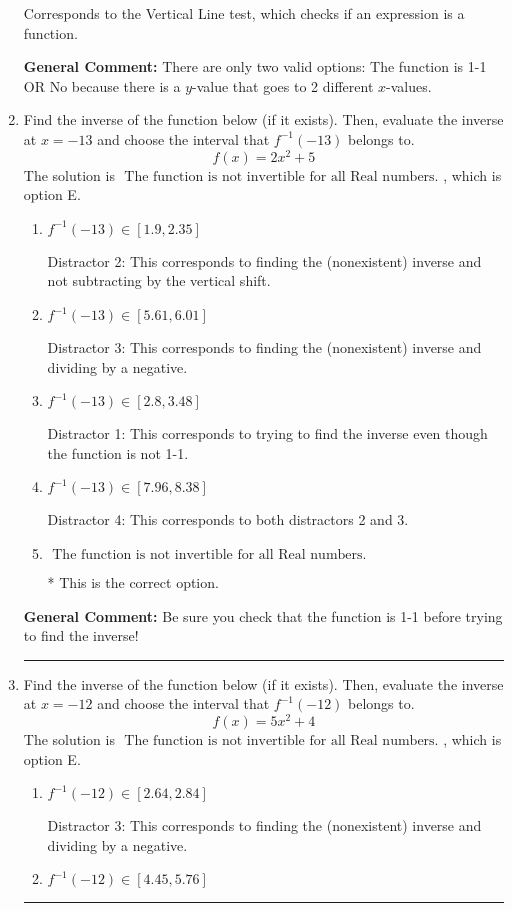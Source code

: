 \documentclass{extbook}[14pt]
\newcommand{\litem}[1]{\item #1

\rule{\textwidth}{0.4pt}}
\begin{document}
\begin{enumerate}
{\begin{enumerate}[label=\Alph*.]
Corresponds to the Vertical Line test, which checks if an expression is a function.
\end{enumerate}

\textbf{General Comment:} There are only two valid options: The function is 1-1 OR No because there is a $y$-value that goes to 2 different $x$-values.
}
\litem{
Find the inverse of the function below (if it exists). Then, evaluate the inverse at $x = -13$ and choose the interval that $f^{-1}(-13)$ belongs to.
\[ f(x) = 2 x^2 + 5 \]The solution is \( \text{ The function is not invertible for all Real numbers. } \), which is option E.\begin{enumerate}[label=\Alph*.]
\item \( f^{-1}(-13) \in [1.9, 2.35] \)

 Distractor 2: This corresponds to finding the (nonexistent) inverse and not subtracting by the vertical shift.
\item \( f^{-1}(-13) \in [5.61, 6.01] \)

 Distractor 3: This corresponds to finding the (nonexistent) inverse and dividing by a negative.
\item \( f^{-1}(-13) \in [2.8, 3.48] \)

 Distractor 1: This corresponds to trying to find the inverse even though the function is not 1-1. 
\item \( f^{-1}(-13) \in [7.96, 8.38] \)

 Distractor 4: This corresponds to both distractors 2 and 3.
\item \( \text{ The function is not invertible for all Real numbers. } \)

* This is the correct option.
\end{enumerate}

\textbf{General Comment:} Be sure you check that the function is 1-1 before trying to find the inverse!
}
\litem{
Find the inverse of the function below (if it exists). Then, evaluate the inverse at $x = -12$ and choose the interval that $f^{-1}(-12)$ belongs to.
\[ f(x) = 5 x^2 + 4 \]The solution is \( \text{ The function is not invertible for all Real numbers. } \), which is option E.\begin{enumerate}[label=\Alph*.]
\item \( f^{-1}(-12) \in [2.64, 2.84] \)

 Distractor 3: This corresponds to finding the (nonexistent) inverse and dividing by a negative.
\item \( f^{-1}(-12) \in [4.45, 5.76] \)


\end{enumerate}}
\end{enumerate}
\end{document}
